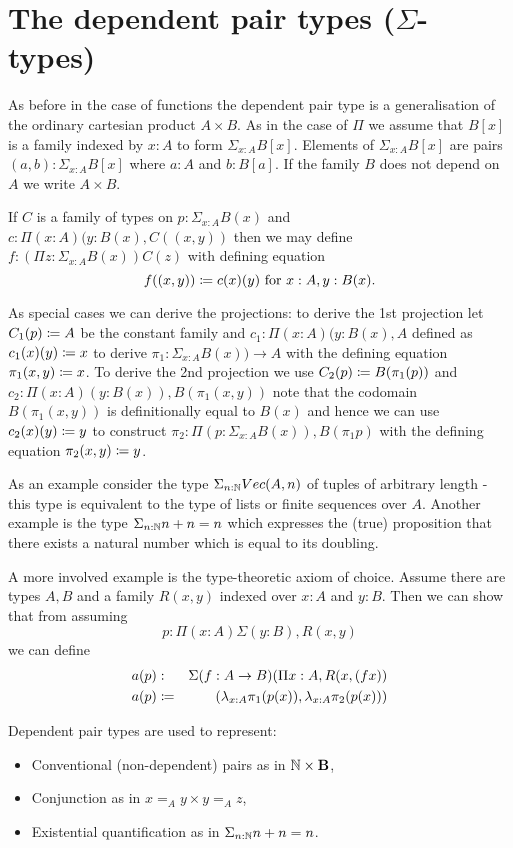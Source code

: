 \section{The dependent pair types ($\Sigma$-types)}

As before in the case of functions the dependent pair type is a
generalisation of the ordinary cartesian product $A \times B$. 
As in the case of $\Pi$ we assume that $B[x]$ is a family indexed by
$x:A$ to form $\Sigma_{x:A}B[x]$. Elements of $\Sigma_{x:A}B[x]$ are
pairs $(a,b) : \Sigma_{x:A}B[x]$ where $a:A$ and $b:B[a]$. If the
family $B$ does not depend on $A$ we write $A \times B$.

If $C$ is a family of types on $p:\Sigma_{x:A}B(x)$ and 
$c:\Pi (x:A)(y:B(x),C((x,y))$ then we may define 
$f:(\Pi z:\Sigma_{x:A}B(x))C(z)$ with defining equation
  \[f((x,y))\coloneqq c(x)(y)\mbox{ for } x:A,y:B(x).\]

As special cases we can derive the projections: to derive the 1st
projection let $C_1(p) \coloneqq A$ be the constant family and $c_1 : \Pi (x:A)(y:B(x),A$
defined as $c_1(x)(y) \coloneqq x$ to derive $\pi_1 : \Sigma_{x:A}B(x)) \to A$
with the defining equation $\pi_1 (x,y) \coloneqq x$. To derive the 2nd
projection we use $C_2(p) \coloneqq B (\pi_1(p))$ and $c_2 : \Pi
(x:A)(y:B(x)),B(\pi_1(x,y))$ note that the codomain $B(\pi_1(x,y))$ is
definitionally equal to $B(x)$ and hence we can use $c_2(x)(y) \coloneqq
y$ to construct $\pi_2 : \Pi(p : \Sigma_{x:A}{B(x)}),B(\pi_1 p)$ with
the defining equation $\pi_2(x,y) \coloneqq y$.

As an example consider the type $\Sigma_{n:\mathbb{N}}Vec(A,n)$ of tuples of
arbitrary length - this type is equivalent to the type of lists or
finite sequences over $A$. Another example is the type
$\Sigma_{n:\mathbb{N}}n+n = n$ which expresses the (true) proposition that
there exists a natural number which is equal to its doubling.

A more involved example is the type-theoretic axiom of choice. Assume
there are types $A,B$ and a family $R(x,y)$ indexed over $x:A$ and
$y:B$. Then we can show that from assuming 
\[p : \Pi(x:A)\Sigma(y :B),R(x,y)\] 
we can define 
\begin{eqnarray*}
a(p) & : & \Sigma(f : A \to B)(\Pi x:A,R(x,(fx)) \\
a(p) & \coloneqq & (\lambda_{x:A} \pi_1(p(x)),\lambda_{x:A} \pi_2(p(x)))
\end{eqnarray*}

Dependent pair types are used to represent:
\begin{itemize}
\item Conventional (non-dependent) pairs as in $\mathbb{N} \times {\bf B}$,
\item Conjunction as in $x =_A y \times y =_A z$,
\item Existential quantification as in $\Sigma_{n:\mathbb{N}}n+n = n$.
\end{itemize}


